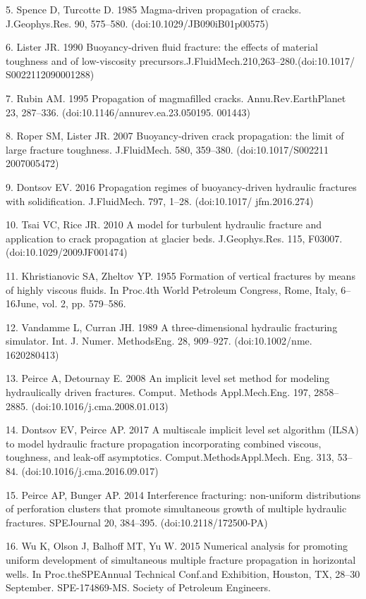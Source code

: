 \documentclass[main.tex]{subfiles}
\begin{document}
5. Spence D, Turcotte D. 1985 Magma-driven propagation of cracks. J.Geophys.Res. 90, 575–580. (doi:10.1029/JB090iB01p00575)

6. Lister JR. 1990 Buoyancy-driven fluid fracture: the effects of material toughness and of low-viscosity precursors.J.FluidMech.210,263–280.(doi:10.1017/ S0022112090001288)

7. Rubin AM. 1995 Propagation of magmafilled cracks. Annu.Rev.EarthPlanet 23, 287–336. (doi:10.1146/annurev.ea.23.050195. 001443)

8. Roper SM, Lister JR. 2007 Buoyancy-driven crack propagation: the limit of large fracture toughness. J.FluidMech. 580, 359–380. (doi:10.1017/S002211 2007005472)

9. Dontsov EV. 2016 Propagation regimes of buoyancy-driven hydraulic fractures with solidification. J.FluidMech. 797, 1–28. (doi:10.1017/ jfm.2016.274)

10. Tsai VC, Rice JR. 2010 A model for turbulent hydraulic fracture and application to crack propagation at glacier beds. J.Geophys.Res. 115, F03007. (doi:10.1029/2009JF001474)

11. Khristianovic SA, Zheltov YP. 1955 Formation of vertical fractures by means of highly viscous fluids. In Proc.4th World Petroleum Congress, Rome, Italy, 6–16June, vol. 2, pp. 579–586.

12. Vandamme L, Curran JH. 1989 A three-dimensional hydraulic fracturing simulator. Int. J. Numer. MethodsEng. 28, 909–927. (doi:10.1002/nme. 1620280413)

13. Peirce A, Detournay E. 2008 An implicit level set method for modeling hydraulically driven fractures. Comput. Methods Appl.Mech.Eng. 197, 2858–2885. (doi:10.1016/j.cma.2008.01.013)

14. Dontsov EV, Peirce AP. 2017 A multiscale implicit level set algorithm (ILSA) to model hydraulic fracture propagation incorporating combined viscous, toughness, and leak-off asymptotics. Comput.MethodsAppl.Mech. Eng. 313, 53–84. (doi:10.1016/j.cma.2016.09.017)

15. Peirce AP, Bunger AP. 2014 Interference fracturing: non-uniform distributions of perforation clusters that promote simultaneous growth of multiple hydraulic fractures. SPEJournal 20, 384–395. (doi:10.2118/172500-PA)

16. Wu K, Olson J, Balhoff MT, Yu W. 2015 Numerical analysis for promoting uniform development of simultaneous multiple fracture propagation in horizontal wells. In Proc.theSPEAnnual Technical Conf.and Exhibition, Houston, TX, 28–30 September. SPE-174869-MS. Society of Petroleum Engineers.
\end{document}
